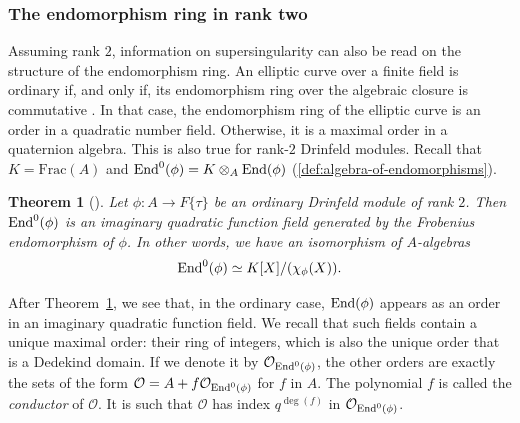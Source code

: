 \documentclass[11pt]{article}
\newtheorem{theorem}{Theorem}[section]
\theoremstyle{definition}
\newcommand\End{\text{\rm End}}
\begin{document}
\subsubsection{The endomorphism ring in rank two}
\label{subsection:endomorphism-ring}

Assuming rank $2$, information on supersingularity can also be read on
the structure of the endomorphism ring. An elliptic curve over a finite field
is ordinary if, and only if, its endomorphism ring over the algebraic closure is commutative
\cite[Chapter V, \S~3]{silverman_arithmetic_2009}. In that case, the endomorphism ring of
the elliptic curve is an order in a quadratic number field. Otherwise,
it is a maximal order in a quaternion algebra. This is also true for rank-$2$ Drinfeld modules.
Recall that $K=\mathrm{Frac}(A)$ and $\End^0(\phi)=K \otimes_A
\End(\phi)$ (\cref{def:algebra-of-endomorphisms}).

\begin{theorem}[]
\label{theo:endordinary}
Let $\phi : A \to F\{\tau\}$ be an ordinary Drinfeld module of rank $2$.
Then $\End^0(\phi)$ is an imaginary quadratic function field generated by
the Frobenius endomorphism of $\phi$. In other words, we have an
isomorphism of $A$-algebras
    \[
      \End^0(\phi) \simeq K[X]/(\chi_\phi(X)).
    \]
\end{theorem}

After Theorem~\ref{theo:endordinary}, we see that, in the ordinary case,
$\End(\phi)$ appears as an order in an imaginary quadratic function field.
We recall that such fields contain a unique maximal order: their
ring of integers, which is also the unique order that is a Dedekind domain.
If we denote it by $\mathcal O_{\End^0(\phi)}$, the other orders are exactly
the sets of the form $\mathcal O = A + f\mathcal{O}_{\End^0(\phi)}$ for $f$ in $A$.
The polynomial $f$ is called the \emph{conductor} of $\mathcal O$. It is such that
$\mathcal O$ has index $q^{\deg(f)}$ in $\mathcal{O}_{\End^0(\phi)}$.
\end{document}
